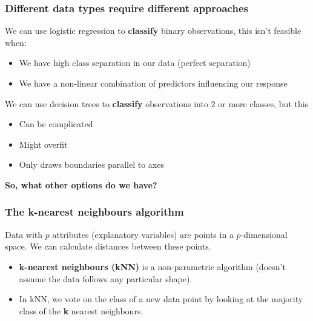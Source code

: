 \documentclass[a4paper]{article}\usepackage[]{graphicx}\usepackage[]{xcolor}
\begin{document}
\subsubsection{Different data types require different approaches}
We can use logistic regression to \textcolor{myblue}{\textbf{classify}} binary observations, this isn't feasible when:
\begin{itemize}
	\item We have high class separation in our data (perfect separation)
	\item We have a non-linear combination of predictors influencing our response
\end{itemize}
We can use decision trees to \textcolor{myblue}{\textbf{classify}} observations into 2 or more classes, but this
\begin{itemize}
	\item Can be complicated
	\item Might overfit
	\item Only draws boundaries parallel to axes
\end{itemize}
\begin{greenbox}
	\textbf{So, what other options do we have?}
\end{greenbox}
\subsubsection{The k-nearest neighbours algorithm}
\begin{goldbox}
	Data with \( p \) attributes (explanatory variables) are points in a \( p \)-dimensional space. We can calculate distances between these points.
\end{goldbox}
\begin{itemize}
	\item \textcolor{mygreen}{\textbf{k-nearest neighbours (kNN)}} is a non-parametric algorithm (doesn't assume the data follows any particular shape).
	\item In kNN, we vote on the class of a new data point by looking at the majority class of the \textcolor{mygreen}{\textbf{k}} nearest neighbours.
\end{itemize}
\end{document}
